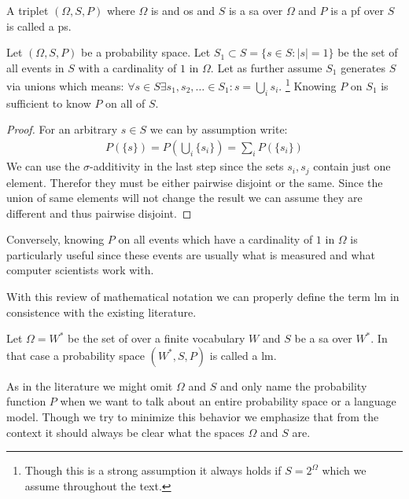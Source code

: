 \documentclass[•]{book}
\begin{document}
\begin{definition}\label{def:ps}
A triplet $(\Omega,S,P)$ where $\Omega$ is and \gls{os} and $S$ is a \gls{sa} over $\Omega$ and $P$ is a \gls{pf} over $S$ is called a \gls{ps}.  
\end{definition}

\begin{remark}\label{rem:continuation}
Let $(\Omega,S,P)$ be a probability space. Let $S_1\subset {S}=\{s\in S : |s|=1\}$ be the set of all events in $S$ with a cardinality of $1$ in $\Omega$. Let as further assume $S_1$ generates $S$ via unions which means: $\forall s\in S \exists s_1,s_2,\dots \in S_1 : s = \bigcup_{i}s_i$. \footnote{Though this is a strong assumption it always holds if $S=2^\Omega$ which we assume throughout the text.} Knowing $P$ on $S_1$ is sufficient to know $P$ on all of $S$.
\begin{proof}
For an arbitrary $s\in S$ we can by assumption write:
\begin{align}
P(\{s\}) =  P(\bigcup_{i}\{s_i\}) = \sum_iP(\{s_i\})
\end{align}
We can use the $\sigma$-additivity in the last step since the sets $s_i,s_j$ contain just one element. Therefor they must be either pairwise disjoint or the same. Since the union of same elements will not change the result we can assume they are different and thus pairwise disjoint. 
\end{proof} 
Conversely, knowing $P$ on all events which have a cardinality of $1$ in $\Omega$ is particularly useful since these events are usually what is measured and what computer scientists work with.
\end{remark}


With this review of mathematical notation we can properly define the term \gls{lm} in consistence with the existing literature.

\begin{definition}\label{def:lm}
Let $\Omega = W^{*}$ be the set of  over a finite vocabulary $W$ and $S$ be a \gls{sa} over $W^{*}$.
In that case a probability space $(W^{*}, S, P)$ is called a \gls{lm}.
\end{definition} 

\begin{remark}
As in the literature we might omit $\Omega$ and $S$ and only name the probability function $P$ when we want to talk about an entire probability space or a language model.
Though we try to minimize this behavior we emphasize that from the context it should always be clear what the spaces $\Omega$ and $S$ are.
\end{remark}
\end{document}
